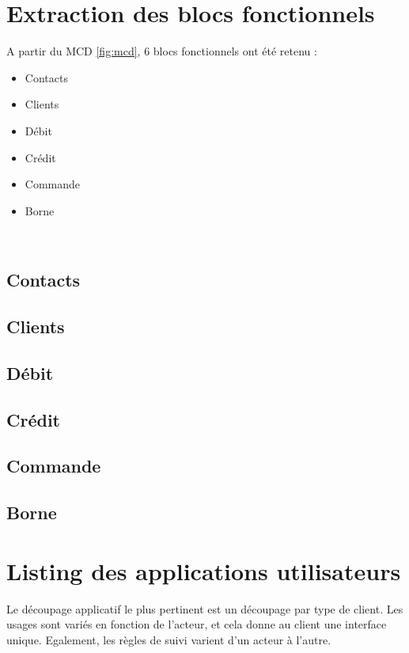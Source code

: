 \section{Extraction des blocs fonctionnels}
A partir du MCD \ref{fig:mcd}, 6 blocs fonctionnels ont été retenu :
\begin{itemize}
  \item Contacts
  \item Clients
  \item Débit
  \item Crédit
  \item Commande
  \item Borne
\end{itemize}
~\\


\subsection{Contacts}

\subsection{Clients}

\subsection{Débit}

\subsection{Crédit}

\subsection{Commande}

\subsection{Borne}

\section{Listing des applications utilisateurs}
Le découpage applicatif le plus pertinent est un découpage par type de client.
Les usages sont variés en fonction de l’acteur, et cela donne au client une
interface unique. Egalement, les règles de suivi varient d’un acteur à
l’autre.\\

